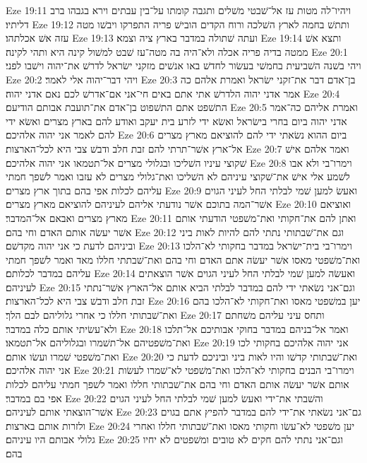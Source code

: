 Eze 19:11  ויהיו־לה מטות עז אל־שׁבטי משׁלים ותגבה קומתו על־בין עבתים וירא בגבהו ברב דליתיו׃
Eze 19:12  ותתשׁ בחמה לארץ השׁלכה ורוח הקדים הובישׁ פריה התפרקו ויבשׁו מטה עזה אשׁ אכלתהו׃
Eze 19:13  ועתה שׁתולה במדבר בארץ ציה וצמא׃
Eze 19:14  ותצא אשׁ ממטה בדיה פריה אכלה ולא־היה בה מטה־עז שׁבט למשׁול קינה היא ותהי לקינה׃
Eze 20:1  ויהי בשׁנה השׁביעית בחמשׁי בעשׂור לחדשׁ באו אנשׁים מזקני ישׂראל לדרשׁ את־יהוה וישׁבו לפני׃
Eze 20:2  ויהי דבר־יהוה אלי לאמר׃
Eze 20:3  בן־אדם דבר את־זקני ישׂראל ואמרת אלהם כה אמר אדני יהוה הלדרשׁ אתי אתם באים חי־אני אם־אדרשׁ לכם נאם אדני יהוה׃
Eze 20:4  התשׁפט אתם התשׁפוט בן־אדם את־תועבת אבותם הודיעם׃
Eze 20:5  ואמרת אליהם כה־אמר אדני יהוה ביום בחרי בישׂראל ואשׂא ידי לזרע בית יעקב ואודע להם בארץ מצרים ואשׂא ידי להם לאמר אני יהוה אלהיכם׃
Eze 20:6  ביום ההוא נשׂאתי ידי להם להוציאם מארץ מצרים אל־ארץ אשׁר־תרתי להם זבת חלב ודבשׁ צבי היא לכל־הארצות׃
Eze 20:7  ואמר אלהם אישׁ שׁקוצי עיניו השׁליכו ובגלולי מצרים אל־תטמאו אני יהוה אלהיכם׃
Eze 20:8  וימרו־בי ולא אבו לשׁמע אלי אישׁ את־שׁקוצי עיניהם לא השׁליכו ואת־גלולי מצרים לא עזבו ואמר לשׁפך חמתי עליהם לכלות אפי בהם בתוך ארץ מצרים׃
Eze 20:9  ואעשׂ למען שׁמי לבלתי החל לעיני הגוים אשׁר־המה בתוכם אשׁר נודעתי אליהם לעיניהם להוציאם מארץ מצרים׃
Eze 20:10  ואוציאם מארץ מצרים ואבאם אל־המדבר׃
Eze 20:11  ואתן להם את־חקותי ואת־משׁפטי הודעתי אותם אשׁר יעשׂה אותם האדם וחי בהם׃
Eze 20:12  וגם את־שׁבתותי נתתי להם להיות לאות ביני וביניהם לדעת כי אני יהוה מקדשׁם׃
Eze 20:13  וימרו־בי בית־ישׂראל במדבר בחקותי לא־הלכו ואת־משׁפטי מאסו אשׁר יעשׂה אתם האדם וחי בהם ואת־שׁבתתי חללו מאד ואמר לשׁפך חמתי עליהם במדבר לכלותם׃
Eze 20:14  ואעשׂה למען שׁמי לבלתי החל לעיני הגוים אשׁר הוצאתים לעיניהם׃
Eze 20:15  וגם־אני נשׂאתי ידי להם במדבר לבלתי הביא אותם אל־הארץ אשׁר־נתתי זבת חלב ודבשׁ צבי היא לכל־הארצות׃
Eze 20:16  יען במשׁפטי מאסו ואת־חקותי לא־הלכו בהם ואת־שׁבתותי חללו כי אחרי גלוליהם לבם הלך׃
Eze 20:17  ותחס עיני עליהם משׁחתם ולא־עשׂיתי אותם כלה במדבר׃
Eze 20:18  ואמר אל־בניהם במדבר בחוקי אבותיכם אל־תלכו ואת־משׁפטיהם אל־תשׁמרו ובגלוליהם אל־תטמאו׃
Eze 20:19  אני יהוה אלהיכם בחקותי לכו ואת־משׁפטי שׁמרו ועשׂו אותם׃
Eze 20:20  ואת־שׁבתותי קדשׁו והיו לאות ביני וביניכם לדעת כי אני יהוה אלהיכם׃
Eze 20:21  וימרו־בי הבנים בחקותי לא־הלכו ואת־משׁפטי לא־שׁמרו לעשׂות אותם אשׁר יעשׂה אותם האדם וחי בהם את־שׁבתותי חללו ואמר לשׁפך חמתי עליהם לכלות אפי בם במדבר׃
Eze 20:22  והשׁבתי את־ידי ואעשׂ למען שׁמי לבלתי החל לעיני הגוים אשׁר־הוצאתי אותם לעיניהם׃
Eze 20:23  גם־אני נשׂאתי את־ידי להם במדבר להפיץ אתם בגוים ולזרות אותם בארצות׃
Eze 20:24  יען משׁפטי לא־עשׂו וחקותי מאסו ואת־שׁבתותי חללו ואחרי גלולי אבותם היו עיניהם׃
Eze 20:25  וגם־אני נתתי להם חקים לא טובים ומשׁפטים לא יחיו בהם׃
